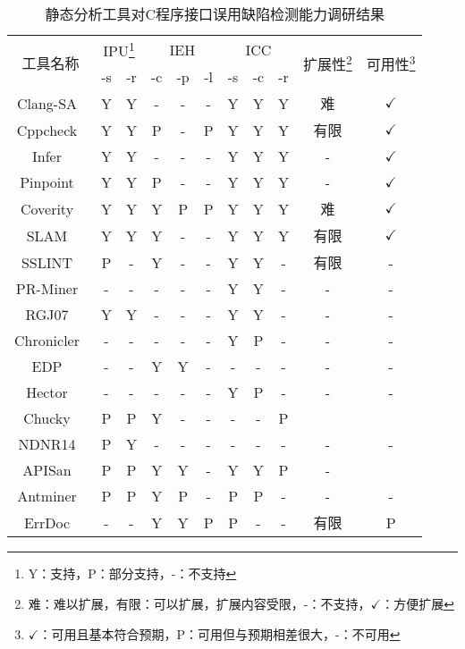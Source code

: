 \begin{table}[t]
	\centering
	\begin{minipage}[t]{0.85\linewidth} %
		\caption{静态分析工具对C程序接口误用缺陷检测能力调研结果}
		\label{tab:3-2-survey}
			\begin{tabular}{@{\extracolsep{3pt}}ccccccccccc@{}}
			\hline
			\multirow{2}{*}{工具名称} & \multicolumn{2}{c}{IPU\footnote{Y：支持，P：部分支持，-：不支持}} & \multicolumn{3}{c}{IEH} & \multicolumn{3}{c}{ICC} & \multirow{2}{*}{扩展性\footnote{难：难以扩展，有限：可以扩展，扩展内容受限，-：不支持，$\checkmark$：方便扩展}} & \multirow{2}{*}{可用性\footnote{$\checkmark$：可用且基本符合预期，P：可用但与预期相差很大，-：不可用}} \\
			\cline{2-3}\cline{4-6}\cline{7-9}
			 & -s & -r & -c & -p & -l & -s & -c & -r & & \\
			\hline
			Clang-SA~\cite{clang-sa} & Y & Y & - & - & - & Y & Y & Y & 难 & $\checkmark$ \\
			Cppcheck~\cite{cppcheck} & Y & Y & P & - & P & Y & Y & Y & 有限 & $\checkmark$ \\
			Infer~\cite{infer} & Y & Y & - & - & - & Y & Y & Y & - & $\checkmark$ \\
			Pinpoint~\cite{pinpoint} & Y & Y & P & - & - & Y & Y & Y & - & $\checkmark$ \\
			Coverity~\cite{coverity} & Y & Y & Y & P & P & Y & Y & Y & 难 & $\checkmark$ \\
			\hline 
			SLAM~\cite{slam} & Y & Y & Y & - & - & Y & Y & Y & 有限 & $\checkmark$ \\
			SSLINT~\cite{15-sp-sslint} & P & - & Y & - & - & Y & Y & - & 有限 & - \\
			\hline
			PR-Miner~\cite{05-fse-prminer} & - & - & - & - & - & Y & Y & - & - & - \\
			RGJ07~\cite{07-PLDI-RGJ07} & Y & Y & - & - & - & Y & Y & - & - & - \\
			Chronicler~\cite{07-icse-chronicler} & - & - & - & - & - & Y & P & - & - & - \\
			EDP~\cite{08-fast-eio} & - & - & Y & Y & - & - & - & - & - & - \\
			Hector~\cite{13-dsn-hector} & - & - & - & - & - & Y & P & - & - & - \\
			Chucky~\cite{13-ccs-chucky} & P & P & Y & - & - & - & - & P &  & \checkmark \\
			NDNR14~\cite{14-fse-pre} & P & Y & - & - & - & - & - & - & - & - \\
			APISan~\cite{16-sec-apisan} & P & P & Y & Y & - & Y & Y & P & - & \checkmark \\
			Antminer~\cite{16-icse-antminer}& P & P & Y & P & - & P & P & - & - & - \\
			ErrDoc~\cite{17-fse-errdoc}& - & - & Y & Y & P & P & - & - & 有限 & P \\
			\hline
		\end{tabular}
	\end{minipage}
\end{table}